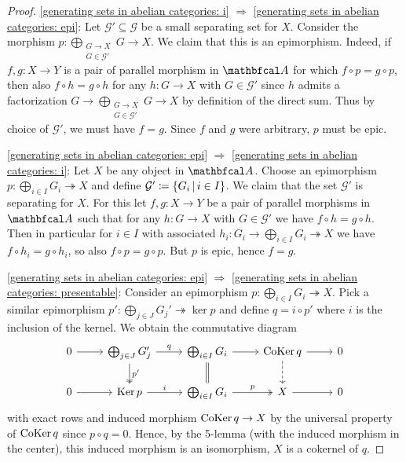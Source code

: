 \begin{proof}
	\ref{generating sets in abelian categories: i} $\Rightarrow$ \ref{generating sets in abelian categories: epi}:\newline
	Let $\mathcal G'\subseteq \mathcal G$ be a small separating set for $X$. Consider the morphism $p\colon \bigoplus_{\substack{G\to X\\G\in\mathcal G'}} G \to X$. We claim that this is an epimorphism. Indeed, if $f,g\colon X\to Y$ is a pair of parallel morphism in $\category A$ for which $f\circ p = g\circ p$, then also $f\circ h = g\circ h$ for any $h\colon G\to X$ with $G\in\mathcal G'$ since $h$ admits a factorization $G\to \bigoplus_{\substack{G\to X\\G\in\mathcal G'}} G \to X$ by definition of the direct sum. Thus by choice of $\mathcal G'$, we must have $f=g$. Since $f$ and $g$ were arbitrary, $p$ must be epic.
	
	\ref{generating sets in abelian categories: epi} $\Rightarrow$ \ref{generating sets in abelian categories: i}:\newline
	Let $X$ be any object in $\category A$. Choose an epimorphism $p\colon \bigoplus_{i\in I} G_i \twoheadrightarrow X$ and define $\mathcal G'\coloneqq \{G_i\,\vert\, i\in I\}$. We claim that the set $\mathcal G'$ is separating for $X$. For this let $f,g\colon X\to Y$ be a pair of parallel morphisms in $\category A$ such that for any $h\colon G\to X$ with $G\in\mathcal G'$ we have $f\circ h=g\circ h$. Then in particular for $i\in I$ with associated $h_i\colon G_i \to \bigoplus_{i\in I} G_i \twoheadrightarrow X$ we have $f\circ h_i = g\circ h_i$, so also $f\circ p = g\circ p$. But $p$ is epic, hence $f=g$.
	
	\ref{generating sets in abelian categories: epi} $\Rightarrow$ \ref{generating sets in abelian categories: presentable}:\newline
	Consider an epimorphism $p\colon \bigoplus_{i\in I} G_i \twoheadrightarrow X$. Pick a similar epimorphism $p'\colon \bigoplus_{j\in J} G_j' \twoheadrightarrow \ker p$ and define $q=i\circ p'$ where $i$ is the inclusion of the kernel. We obtain the commutative diagram
	$$\begin{tikzcd}
		0 &\bigoplus_{j\in J} G_j' 	&\bigoplus_{i\in I} G_i &\coKernel q 	&0\\
		0 &\kernel p 				&\bigoplus_{i\in I} G_i &X 				&0
		\ar[from=2-1, to=2-2]
		\ar[from=2-2, to=2-3, "i"]
		\ar[from=2-3, to=2-4, "p", two heads]
		\ar[from=2-4, to=2-5]
		\ar[from=1-1, to=1-2]
		\ar[from=1-2, to=1-3, "q"]
		\ar[from=1-3, to=1-4]
		\ar[from=1-4, to=1-5]
		\ar[from=1-2, to=2-2, two heads, "p'"]
		\ar[from=1-3, to=2-3, equal]
		\ar[from=1-4, to=2-4, dashed]
	\end{tikzcd}$$
	with exact rows and induced morphism $\operatorname{CoKer} q\to X$ by the universal property of $\operatorname{CoKer} q$ since $p \circ q = 0$. Hence, by the 5-lemma (with the induced morphism in the center), this induced morphism is an isomorphism, \ie $X$ is a cokernel of $q$.
	

\end{proof}
